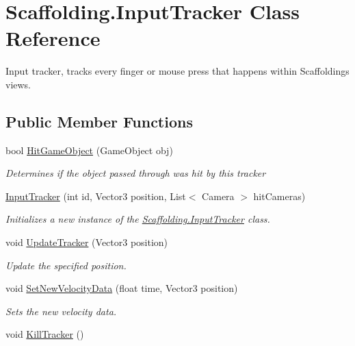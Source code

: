\hypertarget{class_scaffolding_1_1_input_tracker}{\section{Scaffolding.\+Input\+Tracker Class Reference}
\label{class_scaffolding_1_1_input_tracker}
}


Input tracker, tracks every finger or mouse press that happens within Scaffoldings views.  


\subsection*{Public Member Functions}
\begin{DoxyCompactItemize}
\item 
bool \hyperlink{class_scaffolding_1_1_input_tracker_aef292511fa77f23f3235fbad1939b4b5}{Hit\+Game\+Object} (Game\+Object obj)
\begin{DoxyCompactList}\small\item\em Determines if the object passed through was hit by this tracker \end{DoxyCompactList}\item 
\hyperlink{class_scaffolding_1_1_input_tracker_a7ca2f8e54f0c2b79ab88151833339e44}{Input\+Tracker} (int id, Vector3 position, List$<$ Camera $>$ hit\+Cameras)
\begin{DoxyCompactList}\small\item\em Initializes a new instance of the \hyperlink{class_scaffolding_1_1_input_tracker}{Scaffolding.\+Input\+Tracker} class. \end{DoxyCompactList}\item 
void \hyperlink{class_scaffolding_1_1_input_tracker_aedce3144315d02e9713c7fddacafe5aa}{Update\+Tracker} (Vector3 position)
\begin{DoxyCompactList}\small\item\em Update the specified position. \end{DoxyCompactList}\item 
void \hyperlink{class_scaffolding_1_1_input_tracker_afa1ed7b953c814e9b45a6348c6d08c85}{Set\+New\+Velocity\+Data} (float time, Vector3 position)
\begin{DoxyCompactList}\small\item\em Sets the new velocity data. \end{DoxyCompactList}\item 
void \hyperlink{class_scaffolding_1_1_input_tracker_a38e432bbd719c51f738311b153d6df70}{Kill\+Tracker} ()

\end{DoxyCompactItemize}
